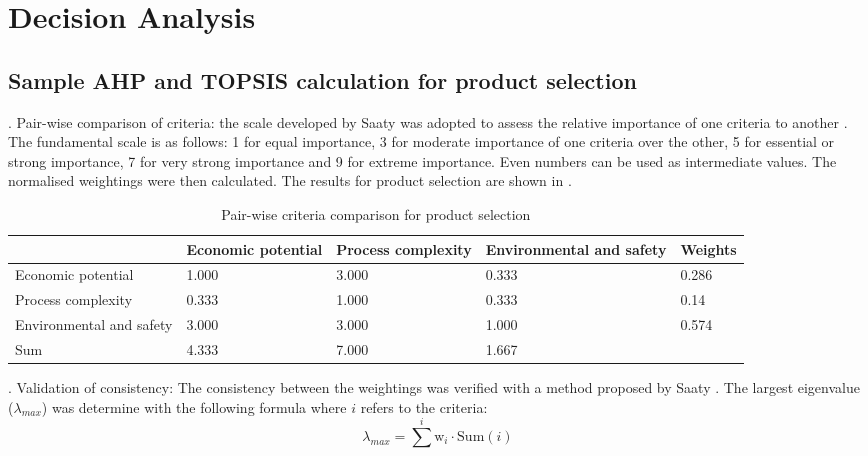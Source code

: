 \section{Decision Analysis}
\label{app:matrix}

\subsection{Sample AHP and TOPSIS calculation for product selection}

. Pair-wise comparison of criteria: the scale developed by Saaty was adopted to assess the relative importance of one criteria to another \cite{saaty_analytic_1987}. The fundamental scale is as follows: 1 for equal importance, 3 for moderate importance of one criteria over the other, 5 for essential or strong importance, 7 for very strong importance and 9 for extreme importance. Even numbers can be used as intermediate values. The normalised weightings were then calculated. The results for product selection are shown in .

\begin{table}[H]
\centering
\caption{Pair-wise criteria comparison for product selection}
\label{tab:pairwise}
\begin{tabularx}{\linewidth}{l|XXXl}
\toprule
                                                                & Economic potential & Process complexity & Environmental and safety & Weights \\ \midrule
Economic potential                        & 1.000              & 3.000              & 0.333                    & 0.286   \\
Process complexity                      & 0.333              & 1.000              & 0.333                    & 0.14    \\
Environmental and   safety & 3.000              & 3.000              & 1.000                    & 0.574   \\
Sum                                      & 4.333              & 7.000              & 1.667                    &                              \\ \bottomrule
\end{tabularx}
\end{table}


. Validation of consistency: The consistency between the weightings was verified with a method proposed by Saaty \cite{saaty_analytic_1987}. The largest eigenvalue ($\lambda_{max}$) was determine with the following formula where $i$ refers to the criteria:
\begin{equation}
    \lambda_{max}=\sum^{i} \mathrm{w}_{i}\cdot \mathrm{Sum}(i)
\end{equation}

